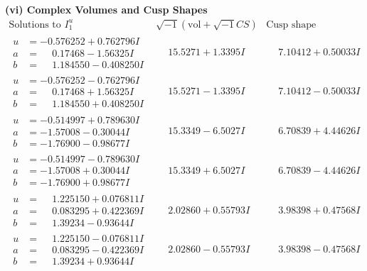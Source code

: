 \documentclass[1p]{elsarticle_modified}
\theoremstyle{definition}
\newcommand{\I}{\sqrt{-1}}
\begin{document}
\newpage\flushleft \textbf{(vi) Complex Volumes and Cusp Shapes}
$$\begin{array}{c|c|c}  
\text{Solutions to }I^u_{1}& \I (\text{vol} + \sqrt{-1}CS) & \text{Cusp shape}\\
 \hline 
\begin{aligned}
u &= -0.576252 + 0.762796 I \\
a &= \phantom{-}0.17468 - 1.56325 I \\
b &= \phantom{-}1.184550 - 0.408250 I\end{aligned}
 & \phantom{-}15.5271 + 1.3395 I & \phantom{-}7.10412 + 0.50033 I \\ \hline\begin{aligned}
u &= -0.576252 - 0.762796 I \\
a &= \phantom{-}0.17468 + 1.56325 I \\
b &= \phantom{-}1.184550 + 0.408250 I\end{aligned}
 & \phantom{-}15.5271 - 1.3395 I & \phantom{-}7.10412 - 0.50033 I \\ \hline\begin{aligned}
u &= -0.514997 + 0.789630 I \\
a &= -1.57008 - 0.30044 I \\
b &= -1.76900 - 0.98677 I\end{aligned}
 & \phantom{-}15.3349 - 6.5027 I & \phantom{-}6.70839 + 4.44626 I \\ \hline\begin{aligned}
u &= -0.514997 - 0.789630 I \\
a &= -1.57008 + 0.30044 I \\
b &= -1.76900 + 0.98677 I\end{aligned}
 & \phantom{-}15.3349 + 6.5027 I & \phantom{-}6.70839 - 4.44626 I \\ \hline\begin{aligned}
u &= \phantom{-}1.225150 + 0.076811 I \\
a &= \phantom{-}0.083295 + 0.422369 I \\
b &= \phantom{-}1.39234 - 0.93644 I\end{aligned}
 & \phantom{-}2.02860 + 0.55793 I & \phantom{-}3.98398 + 0.47568 I \\ \hline\begin{aligned}
u &= \phantom{-}1.225150 - 0.076811 I \\
a &= \phantom{-}0.083295 - 0.422369 I \\
b &= \phantom{-}1.39234 + 0.93644 I\end{aligned}
 & \phantom{-}2.02860 - 0.55793 I & \phantom{-}3.98398 - 0.47568 I \\ \hline\begin{aligned}

\end{aligned}
\end{array}$$
\end{document}
